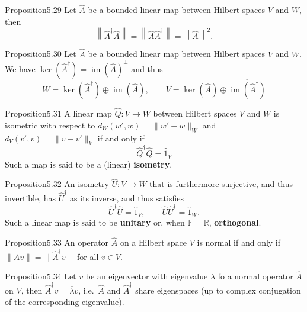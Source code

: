 \begin{res}{Proposition}{5.29}
Let $\hat A$ be a bounded linear map between Hilbert spaces $V$ and $W$, then
\begin{equation}\left\|\hat A^\dagger\hat A\right\|=\left\|\hat A\hat A^\dagger\right\|=\left\|\hat A\right\|^2.\tag{5.44}\end{equation}
\end{res}

\begin{res}{Proposition}{5.30}
Let $\hat A$ be a bounded linear map between Hilbert spaces $V$ and $W$. We have $\ker(\hat A^\dagger)=\operatorname{im}(\hat A)^\perp$ and thus
\begin{equation}W=\ker(\hat A^\dagger)\oplus\overline{\operatorname{im}(\hat A)},\qquad V=\ker(\hat A)\oplus\overline{\operatorname{im}(\hat A^\dagger)}\tag{5.45}\end{equation}
\end{res}

\begin{res}{Proposition}{5.31}
A linear map $\hat Q:V\to W$ between Hilbert spaces $V$ and $W$ is isometric with respect to $d_W(w',w)=\|w'-w\|_W$ and $d_V(v',v)=\|v-v'\|_V$ if and only if
\begin{equation}\hat Q^\dagger\hat Q=\hat 1_V\tag{5.48}\end{equation}
Such a map is said to be a (linear) \textbf{isometry}.
\end{res}

\begin{res}{Proposition}{5.32}
An isometry $\hat U:V\to W$ that is furthermore surjective, and thus invertible, has $\hat U^\dagger$ as its inverse, and thus satisfies
\begin{equation}\hat U^\dagger\hat U=\hat 1_V,\qquad\hat U\hat U^\dagger=\hat 1_W.\tag{5.49}\end{equation}
Such a linear map is said to be \textbf{unitary} or, when $\mathbb F=\mathbb R$, \textbf{orthogonal}.
\end{res}

\begin{res}{Proposition}{5.33}
An operator $\hat A$ on a Hilbert space $V$ is normal if and only if $\|\hat Av\|=\|\hat A^\dagger v\|$ for all $v\in V$.
\end{res}

\begin{res}{Proposition}{5.34}
Let $v$ be an eigenvector with eigenvalue $\lambda$ fo a normal operator $\hat A$ on $V$, then $\hat A^\dagger v=\overline\lambda v$, i.e.\ $\hat A$ and $\hat A^\dagger$ share eigenspaces (up to complex conjugation of the corresponding eigenvalue).
\end{res}

